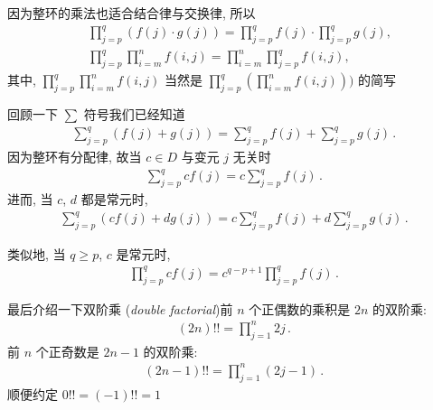 \begin{remark}
    因为整环的乘法也适合结合律与交换律, 所以
    \begin{align*}
         & \prod_{j=p}^{q} (f(j) \cdot g(j)) = \prod_{j=p}^{q} f(j) \cdot \prod_{j=p}^{q} g(j), \\
         & \prod_{j=p}^{q} \prod_{i=m}^{n} f(i,j) = \prod_{i=m}^{n} \prod_{j=p}^{q} f(i,j),
    \end{align*}
    其中, $\prod_{j=p}^{q} \prod_{i=m}^{n} f(i,j)$ 当然是 $\prod_{j=p}^{q} \left( \prod_{i=m}^{n} f(i,j) \right))$ 的简写\period
\end{remark}

\begin{example}
    回顾一下 $\sum$ 符号\period 我们已经知道
    \begin{align*}
        \sum_{j=p}^{q} (f(j) + g(j)) = \sum_{j=p}^{q} f(j) + \sum_{j=p}^{q} g(j) \period
    \end{align*}
    因为整环有分配律, 故当 $c \in D$ 与变元 $j$ 无关时
    \begin{align*}
        \sum_{j=p}^{q} cf(j) = c\sum_{j=p}^{q} f(j) \period
    \end{align*}
    进而, 当 $c$, $d$ 都是常元时,
    \begin{align*}
        \sum_{j=p}^{q} (cf(j) + dg(j)) = c\sum_{j=p}^{q} f(j) + d\sum_{j=p}^{q} g(j) \period
    \end{align*}
\end{example}

\begin{remark}
    类似地, 当 $q \geq p$, $c$ 是常元时,
    \begin{align*}
        \prod_{j=p}^{q} cf(j) = c^{q-p+1} \prod_{j=p}^{q} f(j) \period
    \end{align*}
\end{remark}

\begin{definition}
    最后介绍一下双阶乘 (\textit{double factorial})\period 前 $n$ 个正偶数的乘积是 $2n$ 的双阶乘:
    \begin{align*}
        (2n)!! = \prod_{j=1}^{n} {2j} \period
    \end{align*}
    前 $n$ 个正奇数是 $2n-1$ 的双阶乘:
    \begin{align*}
        (2n-1)!! = \prod_{j=1}^{n} {(2j-1)} \period
    \end{align*}
    顺便约定 $0!! = (-1)!! = 1$\period
\end{definition}

